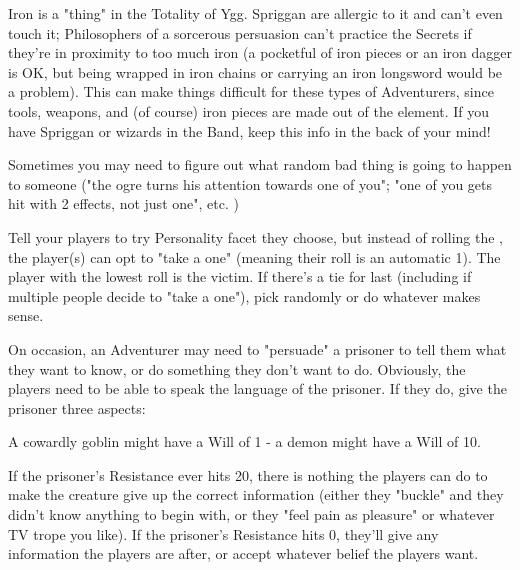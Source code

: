 {

Iron is a "thing" in the Totality of Ygg. Spriggan are allergic to it and can't even touch it; Philosophers of a sorcerous persuasion can't practice the Secrets if they're in proximity to too much iron (a pocketful of iron pieces or an iron dagger is OK, but being wrapped in iron chains or carrying an iron longsword would be a problem).  This can make things difficult for these types of Adventurers, since tools, weapons, and (of course) iron pieces are made out of the element. If you have Spriggan or wizards in the Band, keep this info in the back of your mind!



Sometimes you may need to figure out what random bad thing is going to happen to someone ("the ogre turns his attention towards one of you"; "one of you gets hit with 2 effects, not just one", etc. )

Tell your players to try  Personality facet they choose, but instead of rolling the \UD, the player(s) can opt to "take a one" (meaning their roll is an automatic 1).  The player with the lowest roll is the victim. If there's a tie for last (including if multiple people decide to "take a one"), pick randomly or do whatever makes sense.

\newpage


On occasion, an Adventurer may need to "persuade" a prisoner to tell them what they want to know, or do something they don't want to do. Obviously, the players need to be able to speak the language of the prisoner.  If they do, give the prisoner three aspects: 


A cowardly goblin might have a Will of 1 - a demon might have a Will of 10.

If the prisoner's Resistance ever hits 20, there is nothing the players can do to make the creature give up the correct information (either they "buckle" and they didn't know anything to begin with, or they "feel pain as pleasure" or whatever TV trope you like). If the prisoner's Resistance hits 0, they'll give any information the players are after, or accept whatever belief the players want.

}
